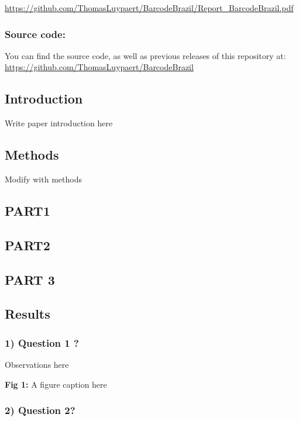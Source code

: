 \documentclass[
  letterpaper,
  DIV=11,
  numbers=noendperiod]{scrartcl}
\begin{document}
\href{https://github.com/ThomasLuypaert/BarcodeBrazil}{https://github.com/ThomasLuypaert/BarcodeBrazil/Report\_BarcodeBrazil.pdf}

\subsubsection{Source code:}\label{source-code}

You can find the source code, as well as previous releases of this
repository at: \url{https://github.com/ThomasLuypaert/BarcodeBrazil}

\subsection{Introduction}\label{introduction}

Write paper introduction here

\subsection{Methods}\label{methods}

Modify with methods

\subsection{PART1}\label{part1}

\subsection{PART2}\label{part2}

\subsection{PART 3}\label{part-3}

\subsection{Results}\label{results}

\subsubsection{1) Question 1 ?}\label{question-1}

Observations here

\textbf{Fig 1:} A figure caption here

\subsubsection{2) Question 2?}\label{question-2}
\end{document}

